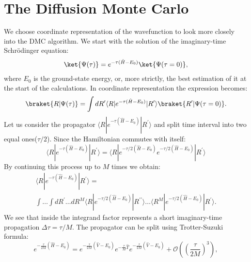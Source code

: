 \documentclass[twoside,english]{uiofysmaster}
\begin{document}
\section{The Diffusion Monte Carlo}
We choose coordinate representation of the wavefunction to look more closely into the DMC algorithm.%
We start with the solution of the imaginary-time Schr\"{o}dinger equation:
\begin{equation}\label{SEsolutionpropagator1}
\ket{\Psi(\tau)}= e^{-\tau (\hat{H} - E_0)}\ket{\Psi(\tau = 0)},
\end{equation}
where $E_0$ is the ground-state energy, or, more strictly, the best estimation of it at the start of the calculations. In coordinate representation the expression becomes:
\begin{equation}\label{SEsolutionpropagator2}
\braket{R|\Psi(\tau)}= \int dR^{\prime} \langle R|e^{-\tau (\hat{H} - E_0)}|R^{\prime}\rangle \braket{R^{\prime}|\Psi(\tau = 0)}.
\end{equation}
Let us consider the propagator $\langle R|e^{-\tau (\hat{H} - E_0)}|R^{\prime}\rangle$ and split time interval into two equal ones($\tau/2$). Since the Hamiltonian commutes with itself:
\begin{equation}\label{SEsolutionpropagator3}
\langle R|e^{-\tau (\hat{H} - E_0)}|R^{\prime}\rangle = \langle R|e^{-\tau/2 (\hat{H} - E_0)}e^{-\tau/2 (\hat{H} - E_0)}|R^{\prime}\rangle
\end{equation}
By continuing this process up to $M$ times we obtain:
\begin{align}\label{SEsolutionpropagator4}
\langle R|e^{-\tau (\hat{H} - E_0)}|R^{\prime}\rangle =\\
\int \dots \int dR^{\prime} \dots dR^M \langle R|e^{-\tau/2 (\hat{H} - E_0)}|R^{\prime\prime}\rangle \dots \langle R^M|e^{-\tau/2 (\hat{H} - E_0)}|R^{\prime}\rangle.
\end{align}
We see that inside the integrand factor represents a short imaginary-time propagation $\Delta \tau = \tau/M$. The propagator can be split using Trotter-Suzuki formula:
\begin{equation}\label{SEsolutionpropagator5}
e^{- \frac{\tau}{2M} (\hat{H} - E_0)} = e^{-\frac{\tau}{2M} (\hat{V} - E_0)} e^{-\frac{\tau}{M} \hat{T}} e^{-\frac{\tau}{2M} (\hat{V} - E_0)} + \mathcal{O}((\frac{\tau}{2M})^3),
\end{equation}
\end{document}
